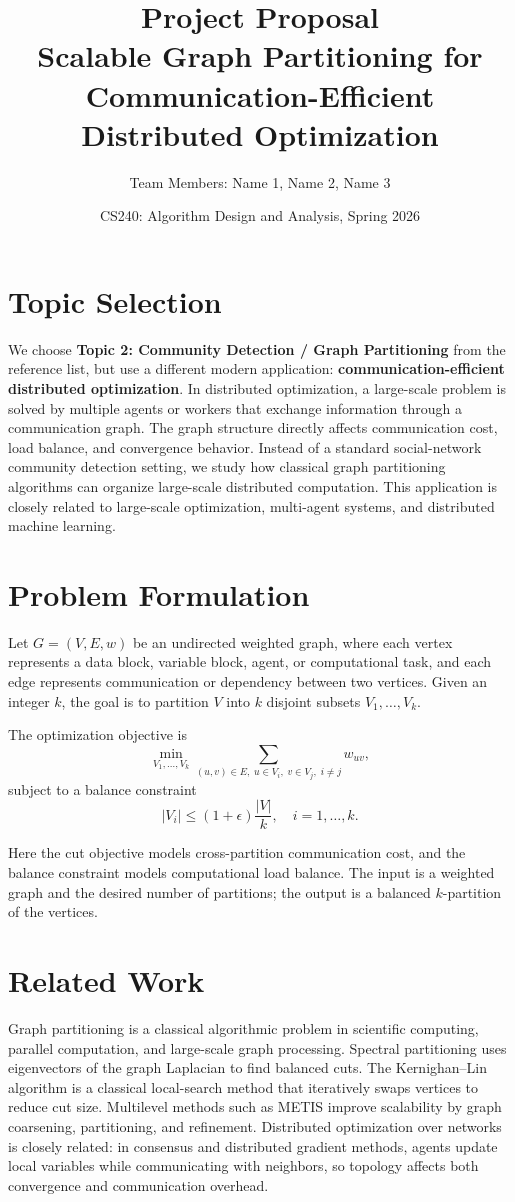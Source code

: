 \documentclass[10pt]{article}
\title{\textbf{Project Proposal}\\
Scalable Graph Partitioning for Communication-Efficient Distributed Optimization}
\author{Team Members: Name 1, Name 2, Name 3}
\date{CS240: Algorithm Design and Analysis, Spring 2026}
\begin{document}
\maketitle

\section{Topic Selection}

We choose \textbf{Topic 2: Community Detection / Graph Partitioning} from the
reference list, but use a different modern application:
\textbf{communication-efficient distributed optimization}. In distributed
optimization, a large-scale problem is solved by multiple agents or workers
that exchange information through a communication graph. The graph structure
directly affects communication cost, load balance, and convergence behavior.
Instead of a standard social-network community detection setting, we study how
classical graph partitioning algorithms can organize large-scale distributed
computation. This application is closely related to large-scale optimization,
multi-agent systems, and distributed machine learning.

\section{Problem Formulation}

Let $G=(V,E,w)$ be an undirected weighted graph, where each vertex represents a
data block, variable block, agent, or computational task, and each edge
represents communication or dependency between two vertices. Given an integer
$k$, the goal is to partition $V$ into $k$ disjoint subsets
$V_1,\ldots,V_k$.

The optimization objective is
\[
    \min_{V_1,\ldots,V_k}
    \sum_{(u,v)\in E,\; u\in V_i,\; v\in V_j,\; i\neq j} w_{uv},
\]
subject to a balance constraint
\[
    |V_i| \leq (1+\epsilon)\frac{|V|}{k},
    \quad i=1,\ldots,k.
\]

Here the cut objective models cross-partition communication cost, and the
balance constraint models computational load balance. The input is a weighted
graph and the desired number of partitions; the output is a balanced
$k$-partition of the vertices.

\section{Related Work}

Graph partitioning is a classical algorithmic problem in scientific computing,
parallel computation, and large-scale graph processing. Spectral partitioning
uses eigenvectors of the graph Laplacian to find balanced cuts. The
Kernighan--Lin algorithm is a classical local-search method that iteratively
swaps vertices to reduce cut size. Multilevel methods such as METIS improve
scalability by graph coarsening, partitioning, and refinement. Distributed
optimization over networks is closely related: in consensus and distributed
gradient methods, agents update local variables while communicating with
neighbors, so topology affects both convergence and communication overhead.
\end{document}
